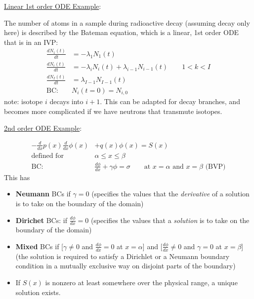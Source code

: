 \documentclass[12pt]{article}
\begin{document}
\vspace*{1em}
\noindent \underline{Linear 1st order ODE Example}:

The number of atoms in a sample during radioactive decay (assuming decay only here) is described by the Bateman equation, which is a linear, 1st order ODE that is in an IVP:
%
\begin{align}
\frac{dN_1(t)}{dt} &= -\lambda_1 N_1(t) \nonumber \\
\frac{dN_i(t)}{dt} &= -\lambda_i N_i(t) + \lambda_{i-1}N_{i-1}(t) \qquad 1 < k < I \nonumber\\
\frac{dN_I(t)}{dt} &= \lambda_{I-1} N_{I-1}(t) \nonumber \\
\text{BC: }& N_i(t=0) = N_{i,0}\nonumber
\end{align}
%
note: isotope $i$ decays into $i+1$. This can be adapted for decay branches, and becomes more complicated if we have neutrons that transmute isotopes. 

\vspace*{1em}
\underline{2nd order ODE Example}:

\begin{align}
-\frac{d}{dx}p(x) \frac{d}{dx}\phi(x) &+ q(x)\phi(x) = S(x) \nonumber \\
\text{defined for }& \alpha \le x \le \beta \nonumber \\
\text{BC: }& \frac{d\phi}{dx} + \gamma \phi = \sigma \qquad \text{at } x=\alpha \text{ and } x = \beta \text{ (BVP)}\nonumber
\end{align}
%
This has
\begin{itemize}
\item \textbf{Neumann} BCs if $\gamma = 0$ (specifies the values that the \textit{derivative} of a solution is to take on the boundary of the domain)
\item \textbf{Dirichet} BCs: if $\frac{d\phi}{dx} = 0$ (specifies the values that a \textit{solution} is to take on the boundary of the domain)
\item \textbf{Mixed} BCs if [$\gamma \ne 0$ and $\frac{d\phi}{dx} = 0$ at $x = \alpha$] and [$\frac{d\phi}{dx} \ne 0$  and $\gamma = 0$ at $x = \beta$] (the solution is required to satisfy a Dirichlet or a Neumann boundary condition in a mutually exclusive way on disjoint parts of the boundary)
\item If $S(x)$ is nonzero at least somewhere over the physical range, a unique solution exists.
\end{itemize}
\end{document}
